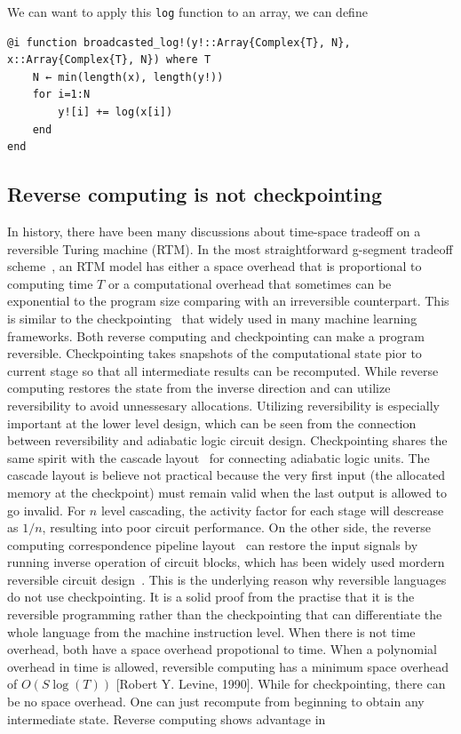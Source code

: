\documentclass{article}
\newcommand{\<}{\langle}
\renewcommand{\>}{\rangle}
\theoremstyle{definition}\newtheorem{definition}{\textit{Definition}}
\begin{document}
We can want to apply this \texttt{log} function to an array, we can define

\begin{minipage}{.88\columnwidth}
\begin{lstlisting}[mathescape=true,caption={Applying the log function to an array.},label={lst:bcast-complex}]
@i function broadcasted_log!(y!::Array{Complex{T}, N}, x::Array{Complex{T}, N}) where T
    N ← min(length(x), length(y!))
    for i=1:N
        y![i] += log(x[i])
    end
end
\end{lstlisting}
\end{minipage}

\subsection{Reverse computing is not checkpointing}\label{sec:timespace}
In history, there have been many discussions about time-space tradeoff on a reversible Turing machine (RTM).
In the most straightforward g-segment tradeoff scheme~\cite{Bennett1989,Levine1990,Perumalla2013}, an RTM model has either a space overhead that is proportional to computing time $T$ or a computational overhead that sometimes can be exponential to the program size comparing with an irreversible counterpart.
This is similar to the checkpointing~\cite{Griewank2008, Chen2016} that widely used in many machine learning frameworks.
Both reverse computing and checkpointing can make a program reversible.
Checkpointing takes snapshots of the computational state pior to current stage so that all intermediate results can be recomputed.
While reverse computing restores the state from the inverse direction and can utilize reversibility to avoid unnessesary allocations.
Utilizing reversibility is especially important at the lower level design, which can be seen from the connection between reversibility and adiabatic logic circuit design.
Checkpointing shares the same spirit with the cascade layout~\cite{Hall1992} for connecting adiabatic logic units.
The cascade layout is believe not practical because the very first input (the allocated memory at the checkpoint) must remain valid when the last output is allowed to go invalid. For $n$ level cascading, the activity factor for each stage will descrease as $1/n$, resulting into poor circuit performance.
On the other side, the reverse computing correspondence pipeline layout~\cite{Athas1994} can restore the input signals by running inverse operation of circuit blocks, which has been widely used mordern reversible circuit design~\cite{Anantharam2004}.
This is the underlying reason why reversible languages do not use checkpointing.
It is a solid proof from the practise that it is the reversible programming rather than the checkpointing that can differentiate the whole language from the machine instruction level.
When there is not time overhead, both have a space overhead propotional to time.
When a polynomial overhead in time is allowed, reversible computing has a minimum space overhead of $O(S\log(T))$  [Robert Y. Levine, 1990]. While for checkpointing, there can be no space overhead. One can just recompute from beginning to obtain any intermediate state.
Reverse computing shows advantage in
\end{document}
